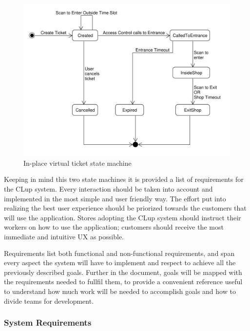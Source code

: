 \begin{figure}[H]
    \centering
    \includegraphics[width=\textwidth]{Images/UML_in_place_virtual_ticket.pdf}
    \caption{ \label{fig:Booked_Ticket_State}In-place virtual ticket state machine}
\end{figure}

Keeping in mind this two state machines it is provided a list of requirements for the CLup system.
Every interaction should be taken into account and implemented in the most simple and user friendly way.
The effort put into realizing the best user experience should be priorized towards the customers that will use the application. Stores adopting the CLup system should instruct their workers on how to use the application; customers should receive the most immediate and intuitive UX as possible.

Requirements list both functional and non-functional requirements, and span every aspect the system will have to implement and respect to achieve all the previously described goals. Further in the document, goals will be mapped with the requirements needed to fullfil them, to provide a convenient reference useful to understand how much work will be needed to accomplish goals and how to divide teams for development.

\vfill

\subsubsection{System Requirements}

